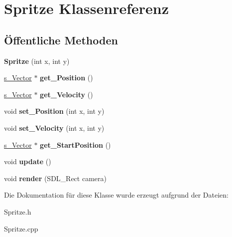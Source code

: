 \hypertarget{class_spritze}{\section{Spritze Klassenreferenz}
\label{class_spritze}
}
\subsection*{Öffentliche Methoden}
\begin{DoxyCompactItemize}
\item 
\hypertarget{class_spritze_a786a149a9e6a937af87566a5c0ab432e}{{\bfseries Spritze} (int x, int y)}\label{class_spritze_a786a149a9e6a937af87566a5c0ab432e}

\item 
\hypertarget{class_spritze_aef30f9337f9559b4873ee895a0c8f4fe}{\hyperlink{structs___vector}{s\-\_\-\-Vector} $\ast$ {\bfseries get\-\_\-\-Position} ()}\label{class_spritze_aef30f9337f9559b4873ee895a0c8f4fe}

\item 
\hypertarget{class_spritze_ad5f7645d831b543b1ca92bd4ccb9c876}{\hyperlink{structs___vector}{s\-\_\-\-Vector} $\ast$ {\bfseries get\-\_\-\-Velocity} ()}\label{class_spritze_ad5f7645d831b543b1ca92bd4ccb9c876}

\item 
\hypertarget{class_spritze_acab9a7ff57ce3ce2f33a3480d04cbe19}{void {\bfseries set\-\_\-\-Position} (int x, int y)}\label{class_spritze_acab9a7ff57ce3ce2f33a3480d04cbe19}

\item 
\hypertarget{class_spritze_aa54b894d1a40b2c1156eb0e62779fa0e}{void {\bfseries set\-\_\-\-Velocity} (int x, int y)}\label{class_spritze_aa54b894d1a40b2c1156eb0e62779fa0e}

\item 
\hypertarget{class_spritze_a5d305371f76fb207684c203e7b4e5fd8}{\hyperlink{structs___vector}{s\-\_\-\-Vector} $\ast$ {\bfseries get\-\_\-\-Start\-Position} ()}\label{class_spritze_a5d305371f76fb207684c203e7b4e5fd8}

\item 
\hypertarget{class_spritze_aaf70068b9356284874156f19f5237c94}{void {\bfseries update} ()}\label{class_spritze_aaf70068b9356284874156f19f5237c94}

\item 
\hypertarget{class_spritze_a2d1fac0870a40d50f0582e1efec53751}{void {\bfseries render} (S\-D\-L\-\_\-\-Rect camera)}\label{class_spritze_a2d1fac0870a40d50f0582e1efec53751}

\end{DoxyCompactItemize}


Die Dokumentation für diese Klasse wurde erzeugt aufgrund der Dateien\-:\begin{DoxyCompactItemize}
\item 
Spritze.\-h\item 
Spritze.\-cpp\end{DoxyCompactItemize}

